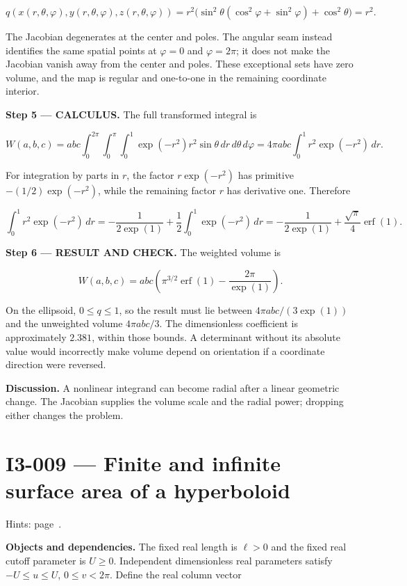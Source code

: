 \documentclass[11pt,oneside,openany]{book}
\begin{document}
\[
q(x(r,\theta,\varphi),y(r,\theta,\varphi),z(r,\theta,\varphi))
=r^2\bigl(\sin^2\theta(\cos^2\varphi+\sin^2\varphi)+\cos^2\theta\bigr)=r^2.
\]

The Jacobian degenerates at the center and poles. The angular seam instead identifies the same spatial points at \(\varphi=0\) and \(\varphi=2\pi\); it does not make the Jacobian vanish away from the center and poles. These exceptional sets have zero volume, and the map is regular and one-to-one in the remaining coordinate interior.

\endgroup
\textbf{Step 5 --- CALCULUS.} The full transformed integral is

\[
W(a,b,c)=abc\int_0^{2\pi}\int_0^\pi\int_0^1\exp(-r^2)r^2\sin\theta\,dr\,d\theta\,d\varphi
=4\pi abc\int_0^1r^2\exp(-r^2)\,dr.
\]

For integration by parts in \(r\), the factor \(r\exp(-r^2)\) has primitive \(-(1/2)\exp(-r^2)\), while the remaining factor \(r\) has derivative one. Therefore

\[
\int_0^1r^2\exp(-r^2)\,dr
=-\frac{1}{2\exp(1)}+\frac12\int_0^1\exp(-r^2)\,dr
=-\frac{1}{2\exp(1)}+\frac{\sqrt\pi}{4}\operatorname{erf}(1).
\]

\textbf{Step 6 --- RESULT AND CHECK.} The weighted volume is

\[
W(a,b,c)=abc\left(\pi^{3/2}\operatorname{erf}(1)-\frac{2\pi}{\exp(1)}\right).
\]

On the ellipsoid, \(0\le q\le1\), so the result must lie between \(4\pi abc/(3\exp(1))\) and the unweighted volume \(4\pi abc/3\). The dimensionless coefficient is approximately \(2.381\), within those bounds. A determinant without its absolute value would incorrectly make volume depend on orientation if a coordinate direction were reversed.

\textbf{Discussion.} A nonlinear integrand can become radial after a linear geometric change. The Jacobian supplies the volume scale and the radial power; dropping either changes the problem.
\clearpage
\section{I3-009 --- Finite and infinite surface area of a hyperboloid}
\label{problem:I3-009}
{\small Hints: page~\pageref{hints:I3-009}.}\par\medskip

\textbf{Objects and dependencies.} The fixed real length is \(\ell>0\) and the fixed real cutoff parameter is \(U\ge0\). Independent dimensionless real parameters satisfy \(-U\le u\le U\), \(0\le v<2\pi\). Define the real column vector
\end{document}
